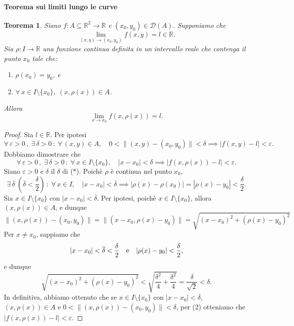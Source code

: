 \documentclass{article}
\theoremstyle{plain}
\newtheorem{thm}{Teorema}[section]
\theoremstyle{definition}
\theoremstyle{remark}
\newcommand{\incfig}[2][\columnwidth]{%
    \def\svgwidth{#1}
    {#2.pdf_tex}
}
\begin{document}
\paragraph{Teorema sui limiti lungo le curve}
\begin{bxthm}
\begin{thm}
    Siano $f:A\subseteq\mathbb{R}^2\to\mathbb{R}$ e $(x_0,y_0)\in\mathcal{D}(A)$.
    Supponiamo che \[\lim_{(x,y)\to(x_0,y_0)}f(x,y)=l\in\mathbb{R}.\]
    Sia $\rho :I\to\mathbb{R}$ una funzione continua definita in un intervallo reale che contenga il punto $x_0$ tale che:
    \begin{enumerate}
        \item $\rho(x_0)=y_0$, e
        \item $\forall\,x\in I\setminus\{x_0\},\;(x,\rho(x))\in A$.
    \end{enumerate} 
    Allora \[\lim_{x\to x_0}f(x,\rho(x))=l.\]
\end{thm}
\end{bxthm}
\begin{proof}
    Sia $l\in\mathbb{R}$. Per ipotesi 
    \[\forall\,\varepsilon>0\,,\;\exists\,\delta>0\,:\;\forall\,(x,y)\in A,\quad 0<\|(x,y)-(x_0,y_0)\|<\delta\implies|f(x,y)-l|<\varepsilon.\]
    Dobbiamo dimostrare che 
    \[\forall\,\varepsilon>0\,,\;\exists\,\delta>0\,:\;\forall\,x\in I\setminus\{x_0\},\quad|x-x_0|<\delta\implies|f(x,\rho(x))-l|<\varepsilon.\]
    Siano $\varepsilon>0$ e $\delta$ il $\delta$ di ($*$). 
    Poichè $\rho$ è continua nel punto $x_0$, 
    \[\exists\,\overline{\delta}\;(\overline{\delta}<\frac{\delta}{2})\,:\;\forall\, x\in I,\quad |x-x_0|<\overline{\delta}\implies|\rho(x)-\rho(x_0)|=|\rho(x)-y_0|<\frac{\delta}{2}.\]
    Sia $x\in I\setminus\{x_0\}$ con $|x-x_0|<\overline{\delta}$.
    Per ipotesi, poichè $x\in I\setminus\{x_0\}$, allora $(x,\rho(x))\in A$, e dunque
    \[ \| (x,\rho(x))-(x_0,y_0) \|=\| (x-x_0, \rho(x)-y_0) \|=\sqrt{(x-x_0)^2+(\rho(x)-y_0)^2}\]
    Per $x\neq x_0$, sappiamo che 
    \[|x-x_0|<\overline{\delta}<\frac{\delta}{2}\quad\textup{e}\quad |\rho(x)-y_0|<\frac{\delta}{2},\]
    e dunque
    \[\sqrt{(x-x_0)^2+(\rho(x)-y_0)^2}<\sqrt{\frac{\delta^2}{4}+\frac{\delta^2}{4}}=\frac{\delta}{\sqrt{2}}<\delta.\]
    In definitiva, abbiamo ottenuto che se $x\in I\setminus\{x_0\}$ con $|x-x_0|<\overline{\delta}$, $(x,\rho(x))\in A$ e $0<\|(x,\rho(x))-(x_0,y_0)\|<\delta$, per ($2$) otteniamo che $|f(x,\rho(x))-l|<\varepsilon$.
\end{proof}
\end{document}

